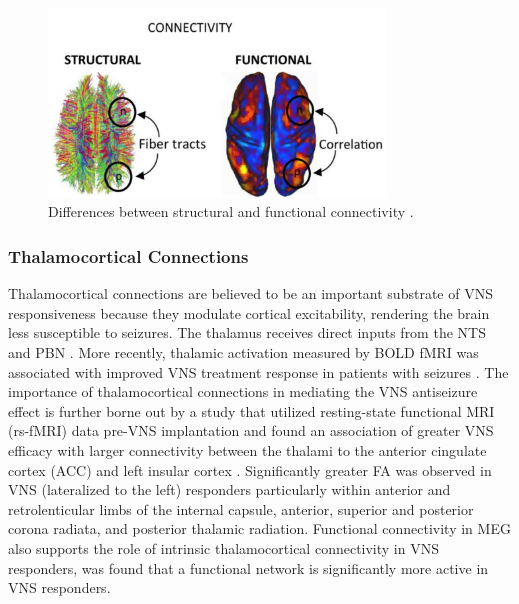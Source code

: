     \begin{figure}[h]
      \centering
      \includegraphics[width=0.8\textwidth]{images/structuralFunctional.png}
      \caption{Differences between structural and functional connectivity \cite{CABRAL201784}.}
      \label{fig:Structural and Functional Connections}
    \end{figure}

    \subsubsection*{Thalamocortical Connections}
    Thalamocortical connections are believed to be an important substrate of VNS responsiveness because they modulate cortical excitability, rendering the brain less susceptible to seizures. The thalamus receives direct inputs from the NTS and PBN \cite{BecksteadJoel2980}. More recently, thalamic activation measured by BOLD fMRI was associated with improved VNS treatment response in patients with seizures \cite{NarayananWatts2002}. The importance of thalamocortical connections in mediating the VNS antiseizure effect is further borne out by a study that utilized resting-state functional MRI (rs-fMRI) data pre-VNS implantation and found an association of greater VNS efficacy with larger connectivity between the thalami to the anterior cingulate cortex (ACC) and left insular cortex \cite{IBRAHIM2017634}.
    Significantly greater FA was observed in VNS (lateralized to the left) responders particularly within anterior and retrolenticular limbs of the internal capsule, anterior, superior and posterior corona radiata, and posterior thalamic radiation. %
    Functional connectivity in MEG also supports the role of intrinsic thalamocortical connectivity in VNS responders, was found that a functional network is significantly more active in VNS responders. \cite{Mithani2019}

